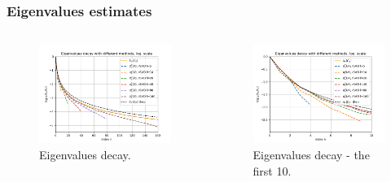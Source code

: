 \begin{frame}
\frametitle{Eigenvalues estimates}

\begin{columns}[t]
  \begin{column}{5cm}
\begin{figure}[H]
\begin{center}
  \includegraphics[scale=0.3]{./img/eigenValues_1.png}
  \caption{Eigenvalues decay.}
\end{center}
\end{figure}

\end{column}
  
  \begin{column}{5cm}
    \begin{figure}[H]
    \begin{center}
  \includegraphics[scale=0.3]{./img/zoom-1.png}
  \caption{Eigenvalues decay - the first 10.}
     \end{center}
     \end{figure}

  \end{column}
 \end{columns}  
\end{frame}

